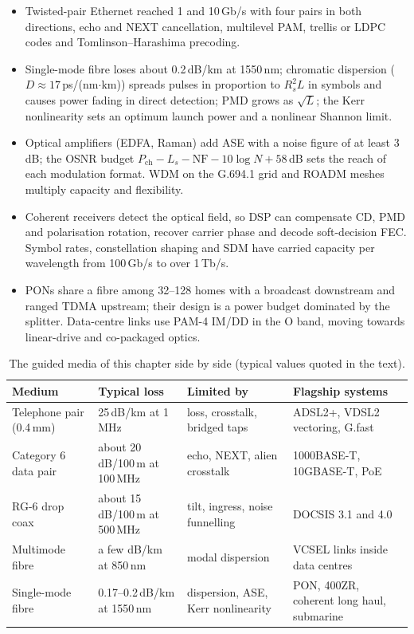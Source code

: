 \begin{itemize}
\item Twisted-pair Ethernet reached 1 and 10\,Gb/s with four pairs in both directions, echo and NEXT
cancellation, multilevel PAM, trellis or LDPC codes and Tomlinson--Harashima precoding.
\item Single-mode fibre loses about 0.2\,dB/km at 1550\,nm; chromatic dispersion
($D\approx17$\,ps/(nm$\cdot$km)) spreads pulses in proportion to $R_s^2L$ in symbols and causes power
fading in direct detection; PMD grows as $\sqrt L$; the Kerr nonlinearity sets an optimum launch power and
a nonlinear Shannon limit.
\item Optical amplifiers (EDFA, Raman) add ASE with a noise figure of at least 3\,dB; the OSNR budget
$P_{\mathrm{ch}}-L_s-\mathrm{NF}-10\log N+58$\,dB sets the reach of each modulation format. WDM on the
G.694.1 grid and ROADM meshes multiply capacity and flexibility.
\item Coherent receivers detect the optical field, so DSP can compensate CD, PMD and polarisation rotation,
recover carrier phase and decode soft-decision FEC. Symbol rates, constellation shaping and SDM have carried
capacity per wavelength from 100\,Gb/s to over 1\,Tb/s.
\item PONs share a fibre among 32--128 homes with a broadcast downstream and ranged TDMA upstream; their
design is a power budget dominated by the splitter. Data-centre links use PAM-4 IM/DD in the O band, moving
towards linear-drive and co-packaged optics.
\end{itemize}

\begin{table}[H]\centering\small
\caption{The guided media of this chapter side by side (typical values quoted in the text).}
\label{tab:ch24:media}
\begin{tabularx}{\linewidth}{@{}l l X X@{}}
\toprule
Medium & Typical loss & Limited by & Flagship systems\\
\midrule
Telephone pair (0.4\,mm) & 25\,dB/km at 1\,MHz & loss, crosstalk, bridged taps & ADSL2+, VDSL2 vectoring, G.fast\\
Category 6 data pair & about 20\,dB/100\,m at 100\,MHz & echo, NEXT, alien crosstalk & 1000BASE-T, 10GBASE-T, PoE\\
RG-6 drop coax & about 15\,dB/100\,m at 500\,MHz & tilt, ingress, noise funnelling & DOCSIS 3.1 and 4.0\\
Multimode fibre & a few dB/km at 850\,nm & modal dispersion & VCSEL links inside data centres\\
Single-mode fibre & 0.17--0.2\,dB/km at 1550\,nm & dispersion, ASE, Kerr nonlinearity & PON, 400ZR, coherent long haul, submarine\\
\bottomrule
\end{tabularx}
\end{table}

